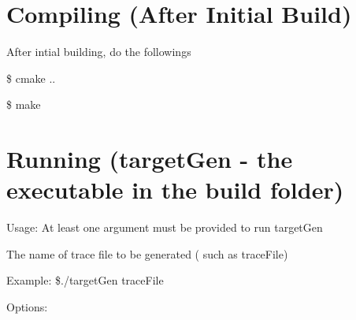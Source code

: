 \section*{Compiling (After Initial Build)}

After intial building, do the followings
\begin{DoxyItemize}
\item \$ cmake ..
\item \$ make
\end{DoxyItemize}

\section*{Running (target\+Gen -\/ the executable in the build folder)}

Usage\+: At least one argument must be provided to run target\+Gen
\begin{DoxyItemize}
\item The name of trace file to be generated ( such as trace\+File)
\end{DoxyItemize}

Example\+: \$./target\+Gen trace\+File

Options\+:

